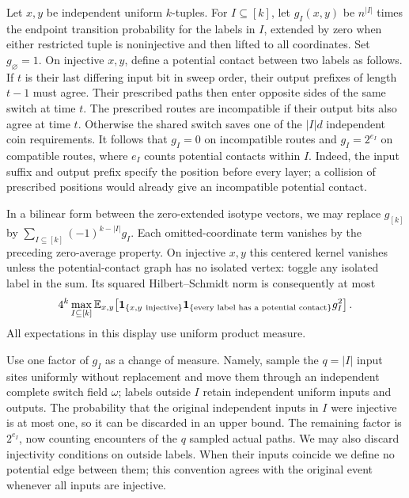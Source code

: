 Let $x,y$ be independent uniform $k$-tuples. For $I\subseteq[k]$,
let $g_I(x,y)$ be $n^{|I|}$ times the endpoint transition
probability for the labels in $I$, extended by zero when either
restricted tuple is noninjective and then lifted to all coordinates.
Set $g_\varnothing=1$. On injective $x,y$, define a potential contact
between two labels as follows. If $t$ is their last differing input
bit in sweep order, their output prefixes of length $t-1$ must agree.
Their prescribed paths then enter opposite sides of the same switch
at time $t$. The prescribed routes are incompatible if their output
bits also agree at time $t$. Otherwise the shared switch saves one
of the $|I|d$ independent coin requirements. It follows that
$g_I=0$ on incompatible routes and
$g_I=2^{e_I}$ on compatible routes, where $e_I$ counts potential
contacts within $I$. Indeed, the input suffix and output prefix
specify the position before every layer; a collision of prescribed
positions would already give an incompatible potential contact.

In a bilinear form between the zero-extended isotype vectors, we
may replace $g_{[k]}$ by
$\sum_{I\subseteq[k]}(-1)^{k-|I|}g_I$. Each omitted-coordinate
term vanishes by the preceding zero-average property. On injective
$x,y$ this centered kernel vanishes unless the potential-contact
graph has no isolated vertex: toggle any isolated label in the sum.
Its squared Hilbert--Schmidt norm is consequently at most
\begin{equation}\label{s:hybrid-centered-kernel-square}
 4^k\max_{I\subseteq[k]}
 \mathbb E_{x,y}\!\left[
  {\bf1}_{\{x,y\ {\rm injective}\}}
  {\bf1}_{\{\text{every label has a potential contact}\}}g_I^2
 \right].
\end{equation}
All expectations in this display use uniform product measure.

Use one factor of $g_I$ as a change of measure. Namely, sample the
$q=|I|$ input sites uniformly without replacement and move them
through an independent complete switch field $\omega$; labels
outside $I$ retain independent uniform inputs and outputs. The
probability that the original independent inputs in $I$ were
injective is at most one, so it can be discarded in an upper bound.
The remaining factor is $2^{e_I}$, now counting encounters of the
$q$ sampled actual paths. We may also discard injectivity conditions
on outside labels. When their inputs coincide we define no potential
edge between them; this convention agrees with the original event
whenever all inputs are injective.


